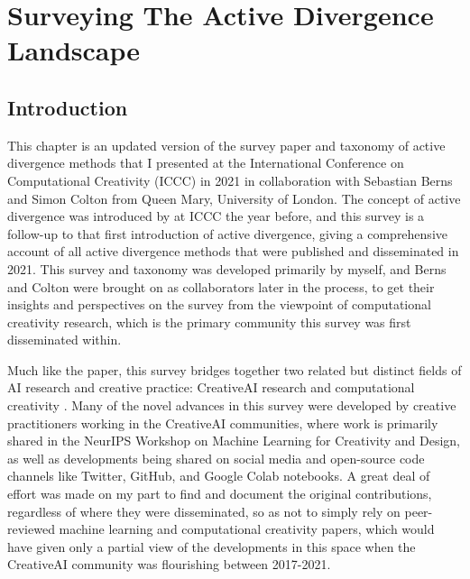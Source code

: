 \chapter{Surveying The Active Divergence Landscape}
\label{ch:active_div}

\section{Introduction}

This chapter is an updated version of the survey paper and taxonomy of active divergence methods that I presented at the International Conference on Computational Creativity (ICCC) in 2021 \citep{broad2021active} in collaboration with Sebastian Berns and Simon Colton from Queen Mary, University of London. 
The concept of active divergence was introduced by \cite{berns2020bridging} at ICCC the year before, and this survey is a follow-up to that first introduction of active divergence, giving a comprehensive account of all active divergence methods that were published and disseminated in 2021. 
This survey and taxonomy was developed primarily by myself, and Berns and Colton were brought on as collaborators later in the process, to get their insights and perspectives on the survey from the viewpoint of computational creativity research, which is the primary community this survey was first disseminated within.

Much like the \cite{berns2020bridging} paper, this survey bridges together two related but distinct fields of AI research and creative practice: CreativeAI research and computational creativity \citep{cook2018neighbouring}.
Many of the novel advances in this survey were developed by creative practitioners working in the CreativeAI communities, where work is primarily shared in the NeurIPS Workshop on Machine Learning for Creativity and Design, as well as developments being shared on social media and open-source code channels like Twitter, GitHub, and Google Colab notebooks. 
A great deal of effort was made on my part to find and document the original contributions, regardless of where they were disseminated, so as not to simply rely on peer-reviewed machine learning and computational creativity papers, which would have given only a partial view of the developments in this space when the CreativeAI community was flourishing between 2017-2021.

